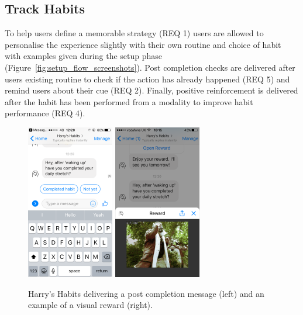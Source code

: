 \subsection*{Track Habits}
To help users define a memorable strategy (REQ 1) users are allowed to personalise the experience slightly with their own routine and choice of habit with examples given during the setup phase (Figure~\ref{fig:setup_flow_screenshots}). Post completion checks are delivered after users existing routine to check if the action has already happened (REQ 5) and remind users about their cue (REQ 2). Finally, positive reinforcement is delivered after the habit has been performed from a modality to improve habit performance (REQ 4).

\begin{figure}[H]
  \centering
  \includegraphics[width=1.5in]{resources/figures/reminder.png}
  \hspace{10px}
  \includegraphics[width=1.5in]{resources/figures/reward-visual.png}
  \caption{Harry's Habits delivering a post completion message (left) and an example of a visual reward (right).}
  \label{fig:delivering_reward}
\end{figure}


